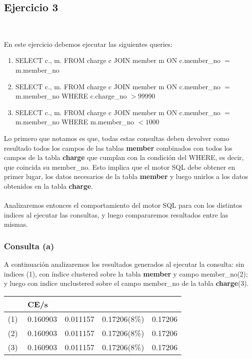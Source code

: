 \subsection{Ejercicio 3}\

En este ejercicio debemos ejecutar las siguientes queries:

\begin{enumerate}[label=(\alph*)]
\item{SELECT c.\*, m.\* FROM charge c JOIN member m ON c.member\_no $=$ m.member\_no}

\item{SELECT c.\*, m.\* FROM charge c JOIN member m ON c.member\_no $=$ m.member\_no WHERE c.charge\_no $> 99990$}

\item{SELECT c.\*, m.\* FROM charge c JOIN member m ON c.member\_no $=$ m.member\_no WHERE m.member\_no $< 1000$}

\end{enumerate}

Lo primero que notamos es que, todas estas consultas deben devolver como resultado todos los campos de las tablas
\textbf{member} combinados con todos los campos de la tabla \textbf{charge} que cumplan con la condición del WHERE, es 
decir, que coincida su member\_no. Esto implica que el motor SQL debe obtener en primer lugar, los datos necesarios de la 
tabla \textbf{member} y luego unirlos a los datos obtenidos en la tabla \textbf{charge}. \\ \\

Analizaremos entonces el comportamiento del motor SQL para con los distintos indices al ejecutar las consultas, y luego compararemos resultados entre las mismas. \\

\subsubsection{Consulta (a)}

A continuación analizaremos los resultados generados al ejecutar la consulta: sin indices (1), con índice clustered sobre la tabla \textbf{member} y campo member\_no(2); y luego con indice unclustered sobre el campo member\_no de la tabla \textbf{charge}(3). \\ 

\begin{tabular}{| L | L | L | L | L |}
    \hline
     & CE/s &  &  &  \\ \hline
    (1) & 0.160903 & 0.011157 & 0.17206(8\%) & 0.17206 \\ \hline %
    (2) & 0.160903 & 0.011157 & 0.17206(8\%) & 0.17206 \\ \hline %
  (3) & 0.160903 & 0.011157 & 0.17206(8\%) & 0.17206 \\ \hline %
\end{tabular}


